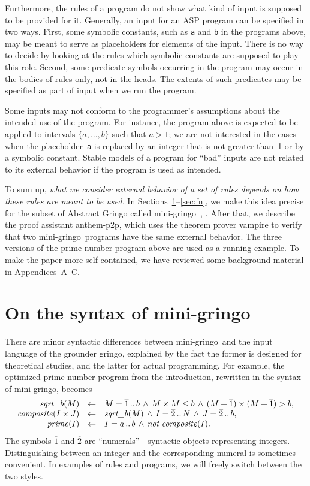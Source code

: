 \documentclass{new_tlp}
\def\ar{\leftarrow}
\def\ba{\begin{array}}
\def\ea{\end{array}}
\def\gringo{{\sc gringo}}
\def\vampire{{\sc vampire}}
\def\num{\overline}
\begin{document}
Furthermore, the rules of a program do not show what kind of input is
supposed to be provided for it.
Generally, an input for an ASP program can be specified in two ways.
First, some symbolic constants, such as {\tt a} and {\tt b} in the
programs above, may be meant to serve as placeholders for elements of
the input.
There is no way to decide by looking at the rules
which symbolic constants are supposed to play this role.
Second, some predicate symbols occurring in the program may occur in
the bodies of rules only, not in the heads.  The extents of such
predicates may be specified as part of input when we run the program.

Some inputs may not conform to the programmer's assumptions about
the intended use of the program.  For instance, the program above is
expected to be applied to intervals $\{a,\dots,b\}$ such that $a>1$;
we are not interested in the cases when the placeholder~{\tt a} is
replaced by an integer that is not greater than~1 or by a symbolic constant.
Stable models of a program for ``bad'' inputs are not related to its
external behavior if the program is used as intended.

To sum up, \emph{what we consider external behavior of a set of rules
depends on how these rules are meant to be used.}
In Sections~\ref{sec:mg}--\ref{sec:fn},
we make this idea precise for the subset of
Abstract Gringo called mini-\gringo\ \cite[Section~2]{fan20},
\cite[Section~2.1]{fan22}.   After that, we
describe the proof assistant {\sc anthem-p2p}, which uses
the theorem prover \hbox{\vampire} \cite{vor13}
 to verify that two mini-\gringo\ programs have the
 same external behavior.  The three versions of the prime number program
 above are used as a running example.  To make the paper more
 self-contained, we have reviewed some background material in
 Appendices~A--C.

\section{On the syntax of mini-\gringo}\label{sec:mg}

There are minor syntactic differences between
mini-\gringo\ and the input language of the grounder \gringo,
explained by the fact the former is designed for theoretical studies, and the
latter for actual programming.
For example, the optimized prime number program from the introduction,
rewritten in the syntax of mini-\gringo, becomes
$$\ba {rcl}
\emph{sqrt\_b\/}(M) &\ar& M = \num  1\,..\,b \,\land\, M\times M \leq b
          \,\land\, (M+\num 1)\times(M+\num 1) > b,\\
          \emph{composite\/}(I\times J) &\ar& \emph{sqrt\_b\/}(M) \,\land\,
                 I = \num 2\,..\,N \,\land\, J = \num 2\,..\,b,\\
                 \emph{prime\/}(I) &\ar& I = a\,..\,b
                 \,\land\, \emph{not}\ \emph{composite\/}(I).
\ea
$$
The symbols $\num 1$ and $\num 2$ are ``numerals''---syntactic objects
representing integers. Distinguishing between an integer and the corresponding
numeral is sometimes convenient.  In examples of rules and programs, we will
freely switch between the two styles.
\end{document}
